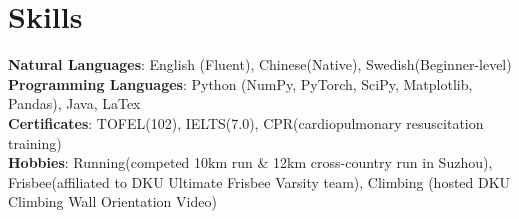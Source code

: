 \documentclass[letterpaper,11pt]{article}
\begin{document}
\section{Skills}
 \begin{itemize}[leftmargin=0.5cm, label={}]
    \small{\item{
     \textbf{Natural Languages}{: English (Fluent), Chinese(Native), Swedish(Beginner-level)} \\
     \textbf{Programming Languages}{: Python (NumPy, PyTorch, SciPy, Matplotlib, Pandas), Java, LaTex} \\
     \textbf{Certificates}{: TOFEL(102), IELTS(7.0), CPR(cardiopulmonary resuscitation training)} \\
     \textbf{Hobbies}{: Running(competed 10km run \& 12km cross-country run in Suzhou), Frisbee(affiliated to DKU Ultimate Frisbee Varsity team), Climbing (hosted DKU Climbing Wall Orientation Video)} \\
    }}
 \end{itemize}
    
\end{document}

